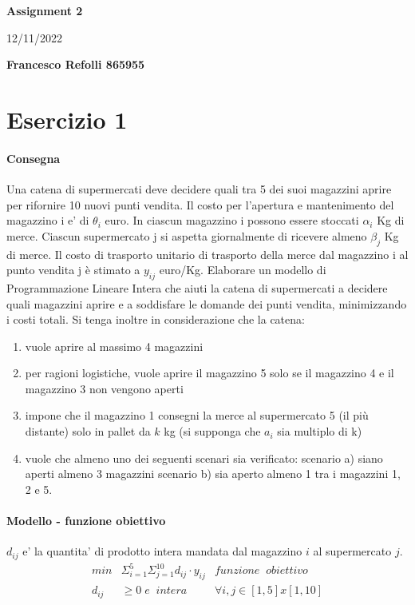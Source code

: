 \documentclass[a4paper,12pt,oneside]{article}
\begin{document}
    \thispagestyle{plain}
    \begin{center}
        \normalsize
        \textbf{Assignment 2}
            
        \vspace{0.2cm}
        \normalsize
        12/11/2022
            
        \vspace{0.2cm}
        \textbf{Francesco Refolli 865955}
    \end{center}

    \section{Esercizio 1}

    \paragraph{Consegna}

    Una catena di supermercati deve decidere quali tra 5 dei suoi magazzini aprire per rifornire 10 nuovi punti vendita. Il costo per l’apertura e mantenimento del magazzino i e' di $\theta_i$ euro. In ciascun magazzino i possono essere stoccati $\alpha_i$ Kg di merce. Ciascun supermercato j si aspetta giornalmente di ricevere almeno $\beta_j$ Kg di merce. Il costo di trasporto unitario di trasporto della merce dal magazzino i al punto vendita j è stimato a $y_{ij}$ euro/Kg. Elaborare un modello di Programmazione Lineare Intera che aiuti la catena di supermercati a decidere quali magazzini aprire e a soddisfare le domande dei punti vendita, minimizzando i costi totali.
    Si tenga inoltre in considerazione che la catena:
    \begin{enumerate}
        \item vuole aprire al massimo 4 magazzini
        \item per ragioni logistiche, vuole aprire il magazzino 5 solo se il magazzino 4 e il magazzino 3 non vengono aperti
        \item impone che il magazzino 1 consegni la merce al supermercato 5 (il più distante) solo in pallet da $k$ kg (si supponga che $a_i$ sia multiplo di k)
        \item vuole che almeno uno dei seguenti scenari sia verificato: scenario a) siano aperti almeno 3 magazzini scenario b) sia aperto almeno 1 tra i magazzini 1, 2 e 5.
    \end{enumerate}

    \paragraph{Modello - funzione obiettivo}
    $d_{ij}$ e' la quantita' di prodotto intera mandata dal magazzino $i$ al supermercato $j$.
    \begin{align*}
        min & \Sigma ^ {5} _ {i=1} \Sigma ^ {10} _ {j=1} d_{ij} \cdot y_{ij} & funzione \;\; obiettivo \\
        d_{ij} &\geq 0 \; e \;\; intera & \forall i,j \in [1,5] x [1,10]
    \end{align*}
\end{document}
